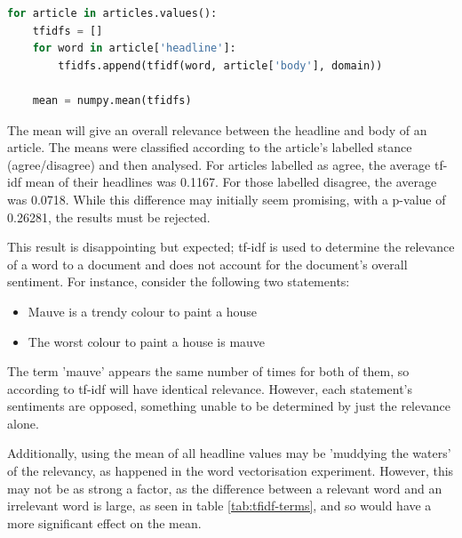 \begin{lstlisting}[language=Python]
for article in articles.values():
    tfidfs = []
    for word in article['headline']:
        tfidfs.append(tfidf(word, article['body'], domain))

    mean = numpy.mean(tfidfs)
\end{lstlisting}

The mean will give an overall relevance between the headline and body of an article. The means were classified according to the article's labelled stance (agree/disagree) and then analysed. For articles labelled as agree, the average tf-idf mean of their headlines was 0.1167. For those labelled disagree, the average was 0.0718. While this difference may initially seem promising, with a p-value of 0.26281, the results must be rejected.

This result is disappointing but expected; tf-idf is used to determine the relevance of a word to a document and does not account for the document's overall sentiment. For instance, consider the following two statements:

\begin{itemize}
	\item Mauve is a trendy colour to paint a house
	\item The worst colour to paint a house is mauve
\end{itemize}

The term 'mauve' appears the same number of times for both of them, so according to tf-idf will have identical relevance. However, each statement's sentiments are opposed, something unable to be determined by just the relevance alone. 

Additionally, using the mean of all headline values may be 'muddying the waters' of the relevancy, as happened in the word vectorisation experiment. However, this may not be as strong a factor, as the difference between a relevant word and an irrelevant word is large, as seen in table \ref{tab:tfidf-terms}, and so would have a more significant effect on the mean.